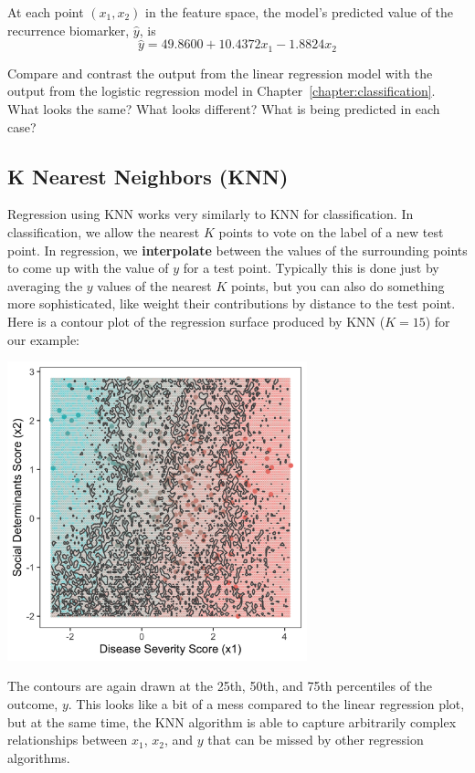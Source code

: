 At each point $(x_1, x_2)$ in the feature space, the model's predicted value of the recurrence biomarker, $\hat{y}$, is
$$ \hat{y} = 49.8600 + 10.4372 x_1 - 1.8824 x_2 $$

\begin{question}{}
Compare and contrast the output from the linear regression model with the output from the logistic regression model in Chapter~\ref{chapter:classification}. What looks the same? What looks different? What is being predicted in each case? 
\end{question}

\subsection{K Nearest Neighbors (KNN)}

Regression using KNN works very similarly to KNN for classification. In classification, we allow the nearest $K$ points to vote on the label of a new test point. In regression, we \textbf{interpolate} between the values of the surrounding points to come up with the value of $y$ for a test point. Typically this is done just by averaging the $y$ values of the nearest $K$ points, but you can also do something more sophisticated, like weight their contributions by distance to the test point. Here is a contour plot of the regression surface produced by KNN ($K=15$) for our example:

\begin{center}
\includegraphics[width=0.65\textwidth]{img/esl-reg-knn-15.png}
\end{center}

\noindent The contours are again drawn at the 25th, 50th, and 75th percentiles of the outcome, $y$. This looks like a bit of a mess compared to the linear regression plot, but at the same time, the KNN algorithm is able to capture arbitrarily complex relationships between $x_1$, $x_2$, and $y$ that can be missed by other regression algorithms.  

